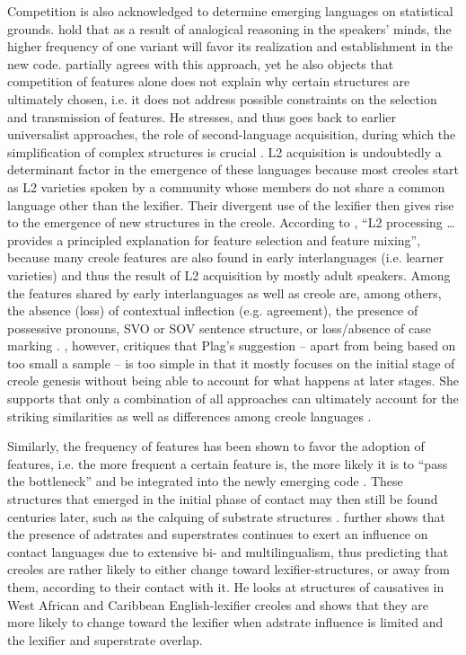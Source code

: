 \documentclass[output=paper,
modfonts
]{langscibook}
\begin{document}
Competition is also acknowledged to determine emerging languages on statistical grounds. \cite{batesetal1987competition} hold that as a result of analogical reasoning in the speakers’ minds, the higher frequency of one variant will favor its realization and establishment in the new code. \cite{plag2011creolization} partially agrees with this approach, yet he also objects that competition of features alone does not explain why certain structures are ultimately chosen, i.e. it does not address possible constraints on the selection and transmission of features. He stresses, and thus goes back to earlier universalist approaches, the role of second-language acquisition, during which the simplification of complex structures is crucial \citep[cf. also][]{trudgill2011sociolinguistic}. L2 acquisition is undoubtedly a determinant factor in the emergence of these languages because most creoles start as L2 varieties spoken by a community whose members do not share a common language other than the lexifier. Their divergent use of the lexifier then gives rise to the emergence of new structures in the creole. According to \cite[102]{plag2011creolization}, “L2 processing … provides a principled explanation for feature selection and feature mixing”, because many creole features are also found in early interlanguages (i.e. learner varieties) and thus the result of L2 acquisition by mostly adult speakers. Among the features shared by early interlanguages as well as creole are, among others, the absence (loss) of contextual inflection (e.g. agreement), the presence of possessive pronouns, SVO or SOV sentence structure, or loss/absence of case marking \citep[93]{plag2011creolization}. \cite{baptista2016creole}, however, critiques that Plag’s suggestion – apart from being based on too small a sample – is too simple in that it mostly focuses on the initial stage of creole genesis without being able to account for what happens at later stages. She supports that only a combination of all approaches can ultimately account for the striking similarities as well as differences among creole languages \citep[140]{baptista2017competition}.

Similarly, the frequency of features has been shown to favor the adoption of features, i.e. the more frequent a certain feature is, the more likely it is to “pass the bottleneck” and be integrated into the newly emerging code \citep{good2013typologizing}. These structures that emerged in the initial phase of contact may then still be found centuries later, such as the calquing of substrate structures \citep[e.g.][]{heineetal2005language}. \cite{yakpo2017towards} further shows that the presence of adstrates and superstrates continues to exert an influence on contact languages due to extensive bi- and multilingualism, thus predicting that creoles are rather likely to either change toward lexifier-structures, or away from them, according to their contact with it. He looks at structures of causatives in West African and Caribbean English-lexifier creoles and shows that they are more likely to change toward the lexifier when adstrate influence is limited and the lexifier and superstrate overlap.
\end{document}
